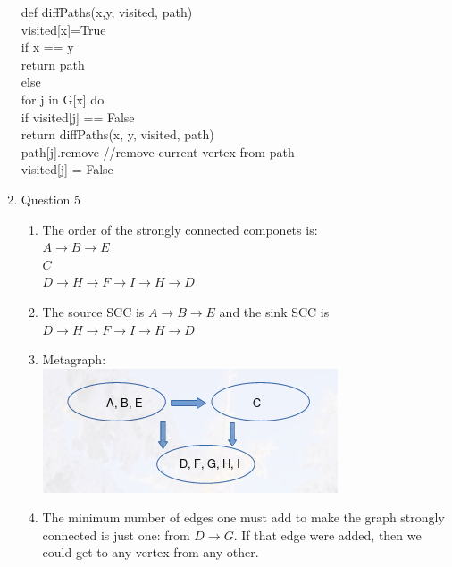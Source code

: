 \documentclass{article}
\newcommand\tab[1][1cm]{\hspace*{#1}}
\begin{document}
\begin{enumerate}
    def diffPaths(x,y, visited, path)\\
    visited[x]=True\\
    if x == y\\
    \tab return path\\
    else\\
    \tab for j in G[x] do\\
    \tab \tab if visited[j] == False\\
    \tab \tab \tab return diffPaths(x, y, visited, path)\\
   \tab \tab path[j].remove //remove current vertex from path\\
   \tab \tab visited[j] = False

\item Question 5\\
  \begin{enumerate}
      \item The order of the strongly connected componets is:\\
        $A \to B \to E$\\
        $C$\\
        $D \to H \to F \to I \to H \to D$
      \item The source SCC is $A \to B \to E$ and the sink SCC 
        is $D \to H \to F \to I \to H \to D$\\
        \pagebreak
      \item Metagraph:\\
      \includegraphics[width=\textwidth]{metagraph.png}
      \item The minimum number of edges one must add to make the graph 
        strongly connected is just one: from $D \to G$. If that edge were
        added, then we could get to any vertex from any other.


  \end{enumerate}
\end{enumerate}
\end{document}
